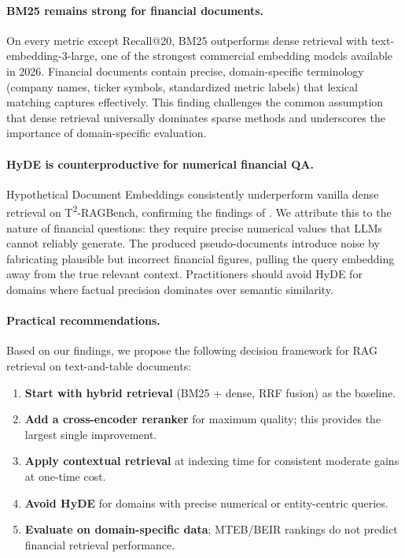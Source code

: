 \documentclass[11pt]{article}
\begin{document}
\paragraph{BM25 remains strong for financial documents.}
On every metric except Recall@20, BM25 outperforms dense retrieval with text-embedding-3-large, one of the strongest commercial embedding models available in 2026. Financial documents contain precise, domain-specific terminology (company names, ticker symbols, standardized metric labels) that lexical matching captures effectively. This finding challenges the common assumption that dense retrieval universally dominates sparse methods and underscores the importance of domain-specific evaluation.

\paragraph{HyDE is counterproductive for numerical financial QA.}
Hypothetical Document Embeddings consistently underperform vanilla dense retrieval on T\textsuperscript{2}-RAGBench, confirming the findings of \citet{strich2026t2ragbench}. We attribute this to the nature of financial questions: they require precise numerical values that LLMs cannot reliably generate. The produced pseudo-documents introduce noise by fabricating plausible but incorrect financial figures, pulling the query embedding away from the true relevant context. Practitioners should avoid HyDE for domains where factual precision dominates over semantic similarity.

\paragraph{Practical recommendations.}
Based on our findings, we propose the following decision framework for RAG retrieval on text-and-table documents:
\begin{enumerate}
    \item \textbf{Start with hybrid retrieval} (BM25 + dense, RRF fusion) as the baseline.
    \item \textbf{Add a cross-encoder reranker} for maximum quality; this provides the largest single improvement.
    \item \textbf{Apply contextual retrieval} at indexing time for consistent moderate gains at one-time cost.
    \item \textbf{Avoid HyDE} for domains with precise numerical or entity-centric queries.
    \item \textbf{Evaluate on domain-specific data}; MTEB/BEIR rankings do not predict financial retrieval performance.
\end{enumerate}
\end{document}
